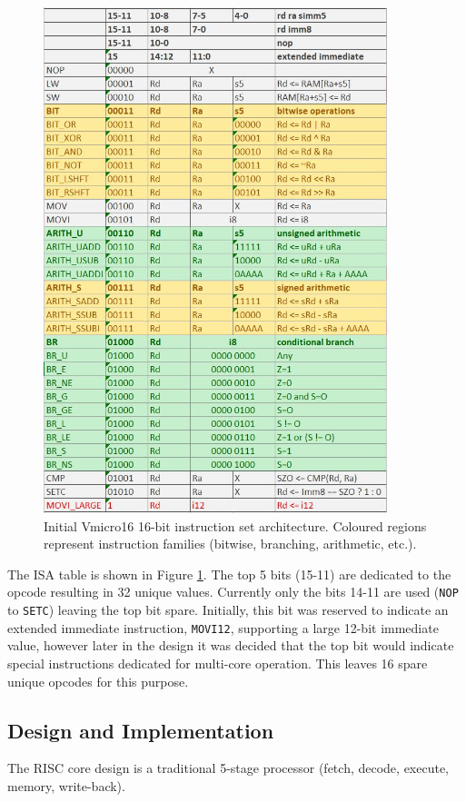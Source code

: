 \documentclass[11pt,a4paper]{report}
\begin{document}
{\begin{figure}[h]
\centering 
\includegraphics[width=10cm]{../img/isa}
\caption{Initial Vmicro16 16-bit instruction set architecture. Coloured regions represent instruction families (bitwise, branching, arithmetic, etc.).}
\label{fig:isa}
\end{figure}
The ISA table is shown in Figure \ref{fig:isa}. The top 5 bits (15-11) are dedicated to the opcode resulting in 32 unique values. Currently only the bits 14-11 are used (\verb|NOP| to \verb|SETC|) leaving the top bit spare. Initially, this bit was reserved to indicate an extended immediate instruction, \verb|MOVI12|, supporting a large 12-bit immediate value, however later in the design it was decided that the top bit would indicate special instructions dedicated for multi-core operation. This leaves 16 spare unique opcodes for this purpose.


\newpage
\subsection{Design and Implementation}
The RISC core design is a traditional 5-stage processor (fetch, decode, execute, memory, write-back).

}
\end{document}
